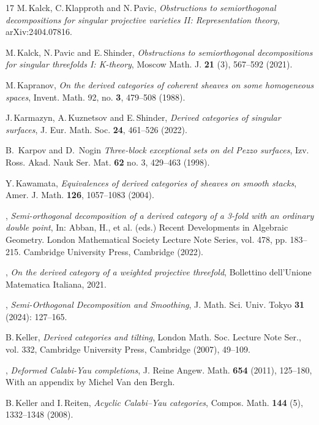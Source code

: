 \documentclass[a4paper,11pt, reqno]{amsart}
\theoremstyle{plain}
\theoremstyle{definition}
\numberwithin{equation}{section}
\begin{document}
\begin{thebibliography}{17}
M.\,Kalck, C.\,Klapproth and N.\,Pavic, 
{\it Obstructions to semiorthogonal decompositions for singular projective varieties II: Representation theory}, arXiv:2404.07816.

M.\,Kalck, N.\,Pavic and E.\,Shinder, 
{\it Obstructions to semiorthogonal decompositions for singular threefolds I: K-theory}, Moscow Math. J. \textbf{21} (3), 567--592 (2021).

 M.\,Kapranov, \emph{On the derived categories of coherent sheaves on some homogeneous spaces}, Invent. Math. 92, no. \textbf{3}, 479--508 (1988).


J.\,Karmazyn, A.\,Kuznetsov and E.\,Shinder,
{\it Derived categories of singular surfaces},
J. Eur. Math. Soc. \textbf{24}, 461--526 (2022).

 B.~Karpov and D.~Nogin
{\it Three-block exceptional sets on del Pezzo surfaces},
Izv. Ross. Akad. Nauk Ser. Mat. \textbf{62} no. 3, 429--463 (1998).


Y.\,Kawamata, 
{\it Equivalences of derived categories of sheaves on smooth stacks}, Amer. J. Math. \textbf{126}, 1057--1083 (2004).



\bysame ,
{\it Semi-orthogonal decomposition of a derived category of a 3-fold with an ordinary double point}, 
In: Abban, H., et al. (eds.) Recent Developments in Algebraic Geometry. London Mathematical Society Lecture Note Series, vol. 478, pp. 183--215. Cambridge University Press, Cambridge (2022).

\bysame,
{\it On the derived category of a weighted projective threefold}, Bollettino dell'Unione Matematica Italiana, 2021.


 \bysame,
{\it Semi-Orthogonal Decomposition and Smoothing}, J. Math. Sci. Univ. Tokyo \textbf{31} (2024): 127--165.

B.\,Keller, {\it Derived categories and tilting}, London Math. Soc. Lecture Note Ser., vol. 332, Cambridge University Press, Cambridge (2007), 49--109. %


\bysame, \emph{Deformed {C}alabi-{Y}au completions}, J. Reine Angew. Math.
  \textbf{654} (2011), 125--180, With an appendix by Michel Van den Bergh.


B.\,Keller and I.\,Reiten, {\it Acyclic Calabi--Yau categories}, 
Compos. Math. \textbf{144} (5), 1332--1348 (2008).



\end{thebibliography}
\end{document}
